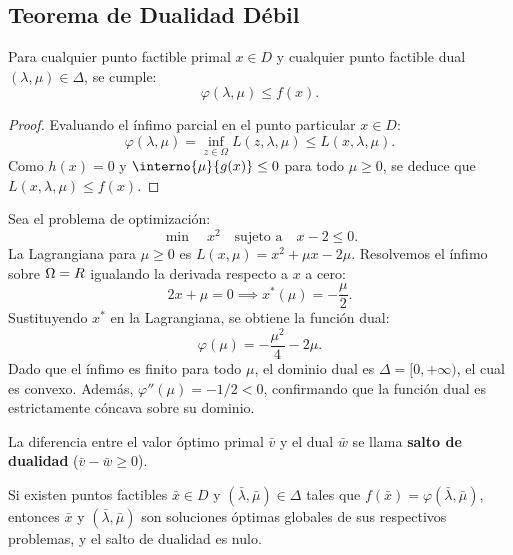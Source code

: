 \subsection{Teorema de Dualidad Débil}

\begin{theorem}\label{v1:thm:dualidad_debil_general}
    Para cualquier punto factible primal $x \in D$ y cualquier punto factible dual $(\lambda, \mu) \in \Delta$, se cumple:
    \begin{equation}
        \varphi(\lambda, \mu) \le f(x).
    \end{equation}
\end{theorem}

\begin{proof}
    Evaluando el ínfimo parcial en el punto particular $x \in D$:
    \[
        \varphi(\lambda, \mu) = \inf_{z \in \Omega} L(z, \lambda, \mu) \le L(x, \lambda, \mu).
    \]
    Como $h(x) = 0$ y $\interno{\mu}{g(x)} \le 0$ para todo $\mu \ge 0$, se deduce que $L(x, \lambda, \mu) \le f(x)$.
\end{proof}

\begin{example}\label{v1:exa:propiedades_dual}
    Sea el problema de optimización:
    \[
        \min \quad x^2 \quad \text{sujeto a} \quad x - 2 \le 0.
    \]
    La Lagrangiana para $\mu \ge 0$ es $L(x, \mu) = x^2 + \mu x - 2\mu$. Resolvemos el ínfimo sobre $\Omega = R$ igualando la derivada respecto a $x$ a cero:
    \[
        2x + \mu = 0 \implies x^*(\mu) = -\frac{\mu}{2}.
    \]
    Sustituyendo $x^*$ en la Lagrangiana, se obtiene la función dual:
    \[
        \varphi(\mu) = -\frac{\mu^2}{4} - 2\mu.
    \]
    Dado que el ínfimo es finito para todo $\mu$, el dominio dual es $\Delta = [0, +\infty)$, el cual es convexo. Además, $\varphi''(\mu) = -1/2 < 0$, confirmando que la función dual es estrictamente cóncava sobre su dominio.
\end{example}

\begin{definition}[]
    La diferencia entre el valor óptimo primal $\bar{v}$ y el dual $\bar{w}$ se llama \textbf{salto de dualidad} ($\bar{v} - \bar{w} \ge 0$).
\end{definition}

\begin{corollary}\label{v1:cor:no_gap}
    Si existen puntos factibles $\bar{x} \in D$ y $(\bar{\lambda}, \bar{\mu}) \in \Delta$ tales que $f(\bar{x}) = \varphi(\bar{\lambda}, \bar{\mu})$, entonces $\bar{x}$ y $(\bar{\lambda}, \bar{\mu})$ son soluciones óptimas globales de sus respectivos problemas, y el salto de dualidad es nulo.
\end{corollary}

